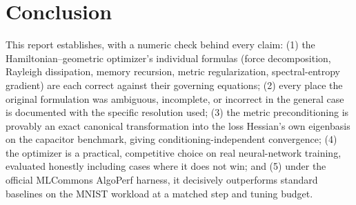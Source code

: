 \documentclass[11pt]{article}
\begin{document}
\section{Conclusion}

This report establishes, with a numeric check behind every claim: (1) the
Hamiltonian--geometric optimizer's individual formulas (force decomposition, Rayleigh
dissipation, memory recursion, metric regularization, spectral-entropy gradient) are each
correct against their governing equations; (2) every place the original formulation was
ambiguous, incomplete, or incorrect in the general case is documented with the specific
resolution used; (3) the metric preconditioning is provably an exact canonical
transformation into the loss Hessian's own eigenbasis on the capacitor benchmark, giving
conditioning-independent convergence; (4) the optimizer is a practical, competitive choice
on real neural-network training, evaluated honestly including cases where it does not
win; and (5) under the official MLCommons AlgoPerf harness, it decisively outperforms
standard baselines on the MNIST workload at a matched step and tuning budget.
\end{document}

